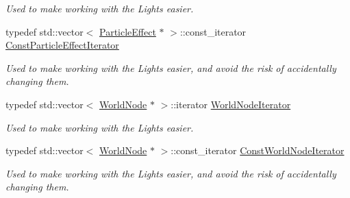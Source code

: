 \begin{DoxyCompactItemize}
\begin{DoxyCompactList}\small\item\em Used to make working with the Lights easier. \item\end{DoxyCompactList}\item 
\hypertarget{classphys_1_1SceneManager_a0026f62b121b0d7010a67a79fdc9000c}{
typedef std::vector$<$ \hyperlink{classphys_1_1ParticleEffect}{ParticleEffect} $\ast$ $>$::const\_\-iterator \hyperlink{classphys_1_1SceneManager_a0026f62b121b0d7010a67a79fdc9000c}{ConstParticleEffectIterator}}
\label{dd/da8/classphys_1_1SceneManager_a0026f62b121b0d7010a67a79fdc9000c}

\begin{DoxyCompactList}\small\item\em Used to make working with the Lights easier, and avoid the risk of accidentally changing them. \item\end{DoxyCompactList}\item 
\hypertarget{classphys_1_1SceneManager_a67b62f6e9116423306b82e20cb2415fd}{
typedef std::vector$<$ \hyperlink{classphys_1_1WorldNode}{WorldNode} $\ast$ $>$::iterator \hyperlink{classphys_1_1SceneManager_a67b62f6e9116423306b82e20cb2415fd}{WorldNodeIterator}}
\label{dd/da8/classphys_1_1SceneManager_a67b62f6e9116423306b82e20cb2415fd}

\begin{DoxyCompactList}\small\item\em Used to make working with the Lights easier. \item\end{DoxyCompactList}\item 
\hypertarget{classphys_1_1SceneManager_aa893eadb43492c0a4a9cafe2d150742c}{
typedef std::vector$<$ \hyperlink{classphys_1_1WorldNode}{WorldNode} $\ast$ $>$::const\_\-iterator \hyperlink{classphys_1_1SceneManager_aa893eadb43492c0a4a9cafe2d150742c}{ConstWorldNodeIterator}}
\label{dd/da8/classphys_1_1SceneManager_aa893eadb43492c0a4a9cafe2d150742c}

\begin{DoxyCompactList}\small\item\em Used to make working with the Lights easier, and avoid the risk of accidentally changing them. \item\end{DoxyCompactList}\end{DoxyCompactItemize}
